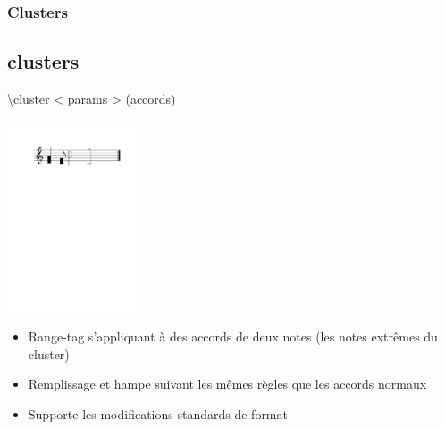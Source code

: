 \documentclass[12pt]{beamer}
\newenvironment{code}
  {\fontfamily{prc}\selectfont}{}
\begin{document}
    \begin{frame}
    \frametitle{Clusters}
    \subsection{clusters}
    
    \begin{code} \textbackslash{}cluster \textless{} params \textgreater{} (accords) \end{code}
    
    \vspace{5mm}
    \centering  \includegraphics[width=4cm]{img/partitions/cluster.pdf}
    
    \begin{itemize}
      \item Range-tag s’appliquant \`a des accords de deux notes (les notes extr\^emes du cluster)  
      \item Remplissage et hampe suivant les mêmes règles que les accords normaux
      \item Supporte les modifications standards de format
    \end{itemize}
    
    \end{frame}
\end{document}
